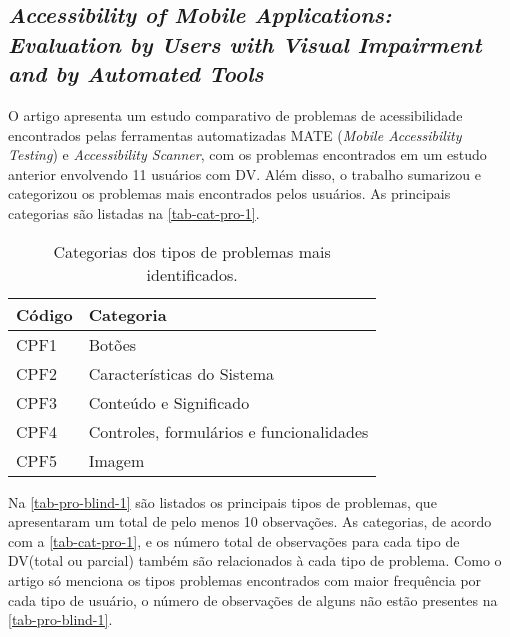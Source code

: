 \subsection{\emph{Accessibility of Mobile Applications: Evaluation by Users with Visual Impairment and by Automated Tools}}

O artigo apresenta um estudo comparativo de problemas de acessibilidade encontrados pelas ferramentas automatizadas MATE (\emph{Mobile Accessibility Testing}) e \emph{Accessibility Scanner}, com os problemas encontrados em um estudo anterior envolvendo 11 usuários com DV\@.
Além disso, o trabalho sumarizou e categorizou os problemas mais encontrados pelos usuários.
As principais categorias são listadas na \autoref{tab-cat-pro-1}.

\begin{table}[htb]
  \begin{center}
    \ABNTEXfontereduzida
    \caption{Categorias dos tipos de problemas mais identificados.}
    \label{tab-cat-pro-1}
    \begin{tabular}{p{2.0cm}|p{7cm}}
      \textbf{Código} & \textbf{Categoria}                       \\
      \hline
      CPF1            & Botões                                   \\
      \hline
      CPF2            & Características do Sistema               \\
      \hline
      CPF3            & Conteúdo e Significado                   \\
      \hline
      CPF4            & Controles, formulários e funcionalidades \\
      \hline
      CPF5            & Imagem                                   \\
    \end{tabular}
  \end{center}
\end{table}

Na \autoref{tab-pro-blind-1} são listados os principais tipos de problemas, que apresentaram um total de pelo menos 10 observações.
As categorias, de acordo com a \autoref{tab-cat-pro-1}, e os número total de observações para cada tipo de DV\@ (total ou parcial) também são relacionados à cada tipo de problema.
Como o artigo só menciona os tipos problemas encontrados com maior frequência por cada tipo de usuário, o número de observações de alguns não estão presentes na \autoref{tab-pro-blind-1}.

